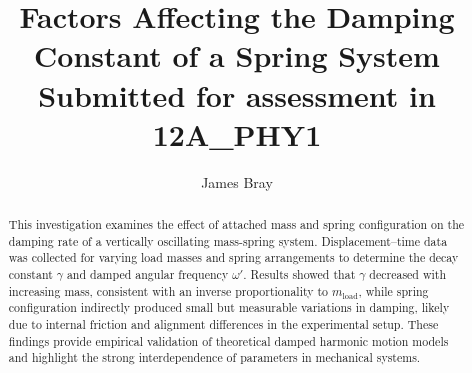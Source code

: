 \begin{frontmatter}

\title{%
\textbf{Factors Affecting the Damping Constant of a Spring System}\\
\small Submitted for assessment in 12A\_PHY1
}

\author{James Bray} 
\address{Christ Church Grammar School}

\renewcommand*{\today}{\DayMonthYearDateFormat\displaydate{dateName}} 

\begin{abstract}

\noindent This investigation examines the effect of attached mass and spring configuration on the damping rate of a vertically oscillating mass-spring system. Displacement--time data was collected for varying load masses and spring arrangements to determine the decay constant $\gamma$ and damped angular frequency $\omega'$. Results showed that $\gamma$ decreased with increasing mass, consistent with an inverse proportionality to $m_{\text{load}}$, while spring configuration indirectly produced small but measurable variations in damping, likely due to internal friction and alignment differences in the experimental setup. These findings provide empirical validation of theoretical damped harmonic motion models and highlight the strong interdependence of parameters in mechanical systems.

\end{abstract}

\end{frontmatter}